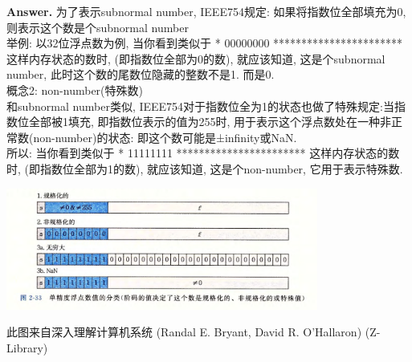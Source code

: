 \documentclass[12pt, a4paper, oneside]{ctexart}
\newenvironment{solution}{\par\noindent\textbf{Answer. }}{\par}
\begin{document}
\begin{solution}
		为了表示subnormal number, IEEE754规定: 如果将指数位全部填充为0, 则表示这个数是个subnormal number\\
		举例: 以32位浮点数为例, 当你看到类似于 * 00000000 *********************** 这样内存状态的数时, (即指数位全部为0的数), 就应该知道, 这是个subnormal number, 此时这个数的尾数位隐藏的整数不是1. 而是0. \\
		\Large 概念2: non-number(特殊数) \\
		\normalsize 和subnormal number类似, IEEE754对于指数位全为1的状态也做了特殊规定:当指数位全部被1填充, 即指数位表示的值为255时, 用于表示这个浮点数处在一种非正常数(non-number)的状态: 即这个数可能是±infinity或NaN. \\
		所以: 当你看到类似于 * 11111111 *********************** 这样内存状态的数时, (即指数位全部为1的数), 就应该知道, 这是个non-number, 它用于表示特殊数. \\
		\begin{center}
			\includegraphics[height=4cm]{QQ20250920-082456}
		\end{center}
		此图来自深入理解计算机系统 (Randal E. Bryant, David R. O’Hallaron) (Z-Library) \\
		
	\end{solution}
	
\end{document}
